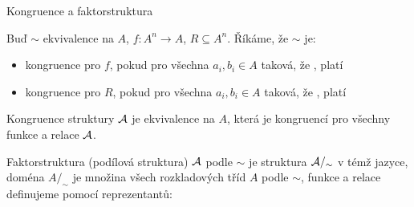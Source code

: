\documentclass{beamer}
\begin{document}
\begin{frame}{Kongruence a faktorstruktura}
    
    \pause    
    Buď $\sim$ ekvivalence na $A$, $f\colon A^n\to A$, $R\subseteq A^n$. Říkáme, že $\sim$ je:\pause
    \begin{itemize}
        \item \alert{kongruence pro $f$}, pokud pro všechna $a_i,b_i\in A$ taková, že , platí \pause
        \item \alert{kongruence pro $R$}, pokud pro všechna $a_i,b_i\in A$ taková, že , platí \pause
    \end{itemize}    
    \alert{Kongruence} struktury $\mathcal{A}$ je ekvivalence na $A$, která je kongruencí pro všechny funkce a relace $\mathcal{A}$. \pause

    \alert{Faktorstruktura (podílová struktura)} $\mathcal{A}$ podle $\sim$ je struktura \alert{$\mathcal{A}/_\sim$ } v témž jazyce, doména $A/_\sim$ je množina všech rozkladových tříd $A$ podle $\sim$, funkce a relace definujeme \alert{pomocí reprezentantů}:\pause
    
        
\end{frame}
\end{document}
